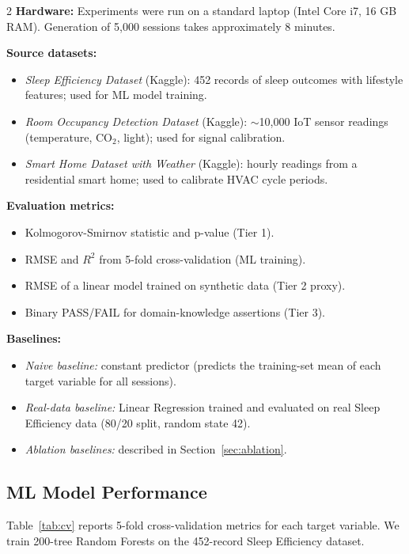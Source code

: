 \documentclass[11pt,a4paper]{article}
\begin{document}
\begin{multicols}{2}
\textbf{Hardware:} Experiments were run on a standard laptop (Intel Core i7,
16 GB RAM).  Generation of 5,000 sessions takes approximately 8 minutes.

\textbf{Source datasets:}
\begin{itemize}\setlength\itemsep{0pt}
  \item \textit{Sleep Efficiency Dataset} (Kaggle): 452 records of sleep outcomes
        with lifestyle features; used for ML model training.
  \item \textit{Room Occupancy Detection Dataset} (Kaggle): $\sim$10,000 IoT sensor
        readings (temperature, CO$_2$, light); used for signal calibration.
  \item \textit{Smart Home Dataset with Weather} (Kaggle): hourly readings from
        a residential smart home; used to calibrate HVAC cycle periods.
\end{itemize}

\textbf{Evaluation metrics:}
\begin{itemize}\setlength\itemsep{0pt}
  \item Kolmogorov-Smirnov statistic and p-value (Tier 1).
  \item RMSE and $R^2$ from 5-fold cross-validation (ML training).
  \item RMSE of a linear model trained on synthetic data (Tier 2 proxy).
  \item Binary PASS/FAIL for domain-knowledge assertions (Tier 3).
\end{itemize}

\textbf{Baselines:}
\begin{itemize}\setlength\itemsep{0pt}
  \item \textit{Naive baseline:} constant predictor (predicts the training-set
        mean of each target variable for all sessions).
  \item \textit{Real-data baseline:} Linear Regression trained and evaluated on
        real Sleep Efficiency data (80/20 split, random state 42).
  \item \textit{Ablation baselines:} described in Section~\ref{sec:ablation}.
\end{itemize}

\subsection{ML Model Performance}

Table~\ref{tab:cv} reports 5-fold cross-validation metrics for each target variable.
We train 200-tree Random Forests on the 452-record Sleep Efficiency dataset.


\end{multicols}
\end{document}
